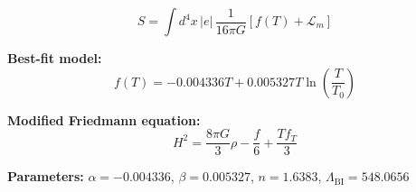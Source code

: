 
\begin{equation}
  S = \int d^4x \, |e| \, \frac{1}{16\pi G} \left[ f(T) + \mathcal{L}_m \right]
\end{equation}

\textbf{Best-fit model:}
\begin{equation}
  f(T) = -0.004336 T + 0.005327 T \ln\!\left(\frac{T}{T_0}\right)
\end{equation}

\textbf{Modified Friedmann equation:}
\begin{equation}
  H^2 = \frac{8\pi G}{3} \rho - \frac{f}{6} + \frac{T f_T}{3}
\end{equation}

\textbf{Parameters:}
$\alpha = -0.004336$, \quad
$\beta = 0.005327$, \quad
$n = 1.6383$, \quad
$\Lambda_{\text{BI}} = 548.0656$